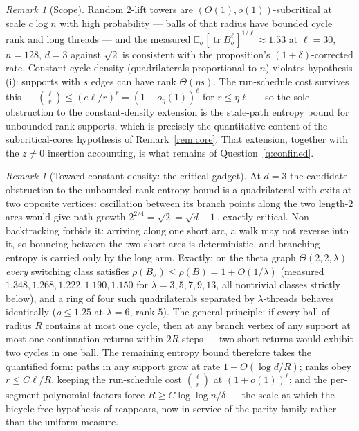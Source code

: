 \documentclass[11pt]{article}
\theoremstyle{remark}
\newtheorem{remark}[lemma]{Remark}
\DeclareMathOperator{\tr}{tr}
\begin{document}
\begin{remark}[Scope]\label{rem:scope}
Random $2$-lift towers are $(O(1),o(1))$-subcritical at scale
$c\log n$ with high probability --- balls of that radius have bounded
cycle rank and long threads --- and the measured
$\mathbb E_\sigma[\tr B_\sigma^{\ell}]^{1/\ell}\approx1.53$ at
$\ell=30$, $n=128$, $d=3$ against $\sqrt2$ is consistent with the
proposition's $(1+\delta)$-corrected rate. Constant cycle density
(quadrilaterals proportional to $n$) violates hypothesis (i): supports
with $s$ edges can have rank $\Theta(\eta s)$. The run-schedule cost
survives this --- $\binom{\ell}{r}\le(e\ell/r)^{r}=(1+o_\eta(1))^{\ell}$
for $r\le\eta\ell$ --- so the sole obstruction to the constant-density
extension is the stale-path entropy bound for unbounded-rank supports,
which is precisely the quantitative content of the subcritical-cores
hypothesis of Remark~\ref{rem:core}. That extension, together with the
$z\ne0$ insertion accounting, is what remains of
Question~\ref{q:confined}.
\end{remark}

\begin{remark}[Toward constant density: the critical gadget]\label{rem:gadget}
At $d=3$ the candidate obstruction to the unbounded-rank entropy bound
is a quadrilateral with exits at two opposite vertices: oscillation
between its branch points along the two length-$2$ arcs would give
path growth $2^{2/4}=\sqrt2=\sqrt{d-1}$, exactly critical.
Non-backtracking forbids it: arriving along one short arc, a walk may
not reverse into it, so bouncing between the two short arcs is
deterministic, and branching entropy is carried only by the long arm.
Exactly: on the theta graph $\Theta(2,2,\lambda)$ \emph{every}
switching class satisfies $\rho(B_\sigma)\le\rho(B)=1+O(1/\lambda)$
(measured $1.348, 1.268, 1.222, 1.190, 1.150$ for
$\lambda=3,5,7,9,13$, all nontrivial classes strictly below), and a
ring of four such quadrilaterals separated by $\lambda$-threads
behaves identically ($\rho\le1.25$ at $\lambda=6$, rank $5$). The
general principle: if every ball of radius $R$ contains at most one
cycle, then at any branch vertex of any support at most one
continuation returns within $2R$ steps --- two short returns would
exhibit two cycles in one ball. The remaining entropy bound therefore
takes the quantified form: paths in any support grow at rate
$1+O(\log d/R)$; ranks obey $r\le C\ell/R$, keeping the run-schedule
cost $\binom{\ell}{r}$ at $(1+o(1))^{\ell}$; and the per-segment
polynomial factors force $R\ge C\log\log n/\delta$ --- the scale at
which the bicycle-free hypothesis of \cite{mop20} reappears, now in
service of the parity family rather than the uniform measure.
\end{remark}
\end{document}
